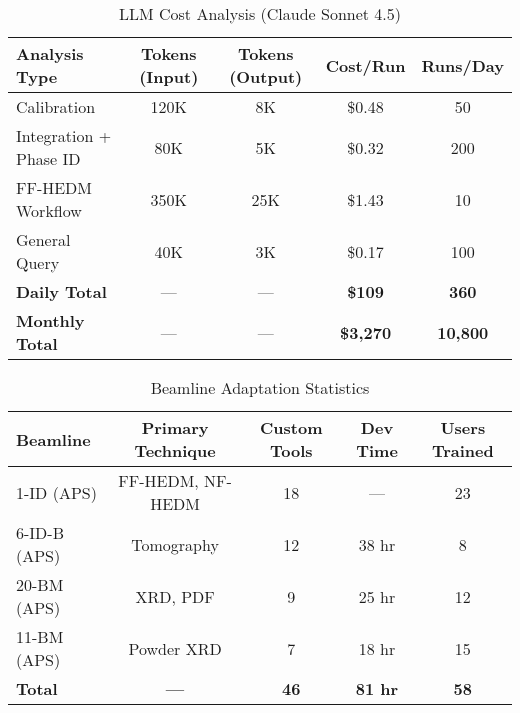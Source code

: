 \documentclass[11pt]{article}
\begin{document}
\begin{table}[htbp]
\centering
\caption{LLM Cost Analysis (Claude Sonnet 4.5)}
\label{tab:llm_costs}
\begin{tabular}{lcccc}
\toprule
Analysis Type & Tokens (Input) & Tokens (Output) & Cost/Run & Runs/Day \\
\midrule
Calibration & 120K & 8K & \$0.48 & 50 \\
Integration + Phase ID & 80K & 5K & \$0.32 & 200 \\
FF-HEDM Workflow & 350K & 25K & \$1.43 & 10 \\
General Query & 40K & 3K & \$0.17 & 100 \\
\midrule
\textbf{Daily Total} & --- & --- & \textbf{\$109} & \textbf{360} \\
\textbf{Monthly Total} & --- & --- & \textbf{\$3,270} & \textbf{10,800} \\
\bottomrule
\end{tabular}
\end{table}

\begin{table}[htbp]
\centering
\caption{Beamline Adaptation Statistics}
\label{tab:beamline_adaptation}
\begin{tabular}{lcccc}
\toprule
Beamline & Primary Technique & Custom Tools & Dev Time & Users Trained \\
\midrule
1-ID (APS) & FF-HEDM, NF-HEDM & 18 & --- & 23 \\
6-ID-B (APS) & Tomography & 12 & 38 hr & 8 \\
20-BM (APS) & XRD, PDF & 9 & 25 hr & 12 \\
11-BM (APS) & Powder XRD & 7 & 18 hr & 15 \\
\midrule
\textbf{Total} & \textbf{---} & \textbf{46} & \textbf{81 hr} & \textbf{58} \\
\bottomrule
\end{tabular}
\end{table}
\end{document}
